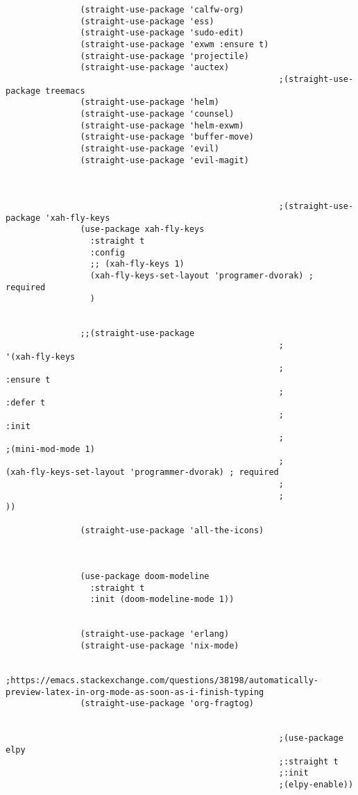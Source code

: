 \documentclass[11pt]{article}
\begin{document}
\begin{verbatim}
               (straight-use-package 'calfw-org)
               (straight-use-package 'ess)
               (straight-use-package 'sudo-edit)
               (straight-use-package 'exwm :ensure t)
               (straight-use-package 'projectile)
               (straight-use-package 'auctex)
                                                       ;(straight-use-package treemacs
               (straight-use-package 'helm)
               (straight-use-package 'counsel)
               (straight-use-package 'helm-exwm)
               (straight-use-package 'buffer-move)
               (straight-use-package 'evil)
               (straight-use-package 'evil-magit)



                                                       ;(straight-use-package 'xah-fly-keys
               (use-package xah-fly-keys
                 :straight t
                 :config
                 ;; (xah-fly-keys 1)
                 (xah-fly-keys-set-layout 'programer-dvorak) ; required
                 )


               ;;(straight-use-package 
                                                       ;                 '(xah-fly-keys
                                                       ;                  :ensure t
                                                       ;                 :defer t
                                                       ;                :init
                                                       ;               ;(mini-mod-mode 1)
                                                       ;              (xah-fly-keys-set-layout 'programmer-dvorak) ; required
                                                       ;
                                                       ;                                ))

               (straight-use-package 'all-the-icons)



               (use-package doom-modeline
                 :straight t
                 :init (doom-modeline-mode 1))


               (straight-use-package 'erlang)
               (straight-use-package 'nix-mode)

                                                       ;https://emacs.stackexchange.com/questions/38198/automatically-preview-latex-in-org-mode-as-soon-as-i-finish-typing
               (straight-use-package 'org-fragtog)


                                                       ;(use-package elpy
                                                       ;:straight t
                                                       ;:init
                                                       ;(elpy-enable))



\end{verbatim}
\end{document}
